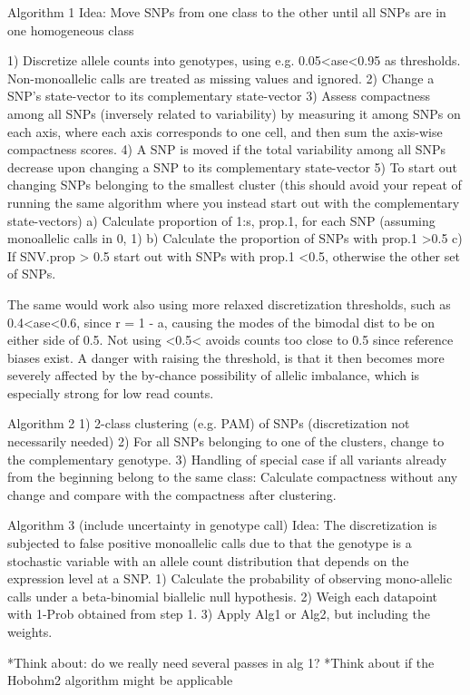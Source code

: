 Algorithm 1
Idea: Move SNPs from one class to the other until all SNPs are in one homogeneous class

1) Discretize allele counts into genotypes, using e.g. 0.05<ase<0.95 as thresholds. Non-monoallelic calls are treated as missing values and ignored.
2) Change a SNP's state-vector to its complementary state-vector
3) Assess compactness among all SNPs (inversely related to variability) by measuring it among SNPs on each axis, where each axis corresponds to one cell, and then sum the axis-wise compactness scores.
4) A SNP is moved if the total variability among all SNPs decrease upon changing a SNP to its complementary state-vector
5) To start out changing SNPs belonging to the smallest cluster (this should avoid your repeat of running the same algorithm where you instead start out with the complementary state-vectors)
a) Calculate proportion of 1:s, prop.1, for each SNP (assuming monoallelic calls in {0, 1})
b) Calculate the proportion of SNPs with prop.1 >0.5
c) If SNV.prop > 0.5 start out with SNPs with prop.1 <0.5, otherwise the other set of SNPs.

The same would work also using more relaxed discretization thresholds, such as 0.4<ase<0.6, since r = 1 - a, causing the modes of the bimodal dist to be on either side of 0.5.
Not using <0.5< avoids counts too close to 0.5 since reference biases exist. A danger with raising the threshold, is that it then becomes more severely affected by the by-chance possibility of allelic imbalance, which is especially strong for low read counts.

Algorithm 2
1) 2-class clustering (e.g. PAM) of SNPs (discretization not necessarily needed)
2) For all SNPs belonging to one of the clusters, change to the complementary genotype.
3) Handling of special case if all variants already from the beginning belong to
the same class: Calculate compactness without any
change and compare with the compactness after clustering.

Algorithm 3 (include uncertainty in genotype call)
Idea: The discretization is subjected to false positive monoallelic calls due to that the genotype is a stochastic variable with an allele count distribution that depends on the expression level at a SNP.
1) Calculate the probability of observing mono-allelic calls under a beta-binomial biallelic null hypothesis.
2) Weigh each datapoint with 1-Prob obtained from step 1. 
3) Apply Alg1 or Alg2, but including the weights.

*Think about: do we really need several passes in alg 1?
*Think about if the Hobohm2 algorithm might be applicable


